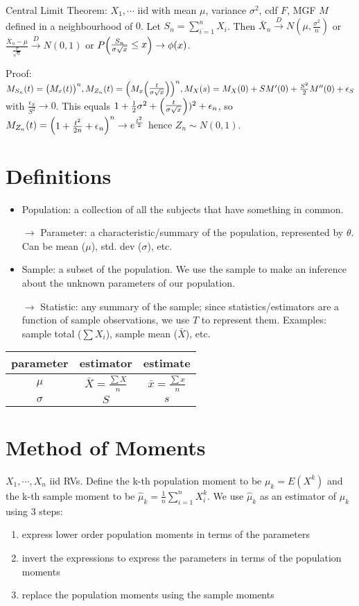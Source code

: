 \documentclass[letterpaper, 8pt]{extarticle}
\begin{document}
\begin{multicols*}{3}
	Central Limit Theorem: $X_1,\cdots$ iid with mean $\mu$, variance $\sigma^2$, cdf $F$, MGF $M$ defined in a neighbourhood of $0$. Let $S_n=\sum_{i=1}^n X_i$. Then $\bar X_n\overset{D}{\to}N(\mu,\frac{\sigma^2}{n})$ or $\frac{\bar X_n-\mu}{\frac{\sigma}{\sqrt n}}\overset{D}{\to}N(0,1)$ or $P\mqty(\frac{S_n}{\sigma\sqrt x}\leq x)\rightarrow\phi(x)$.
	
	Proof: $M_{S_n}(t)=\mqty(M_x(t))^n,M_{Z_n}(t)=\mqty(M_x\mqty(\frac{t}{\sigma\sqrt x}))^n,M_X(s)=M_X(0)+SM'(0)+\frac{S^2}{2}M''(0)+\epsilon_S$ with $\frac{\epsilon_S}{S^2}\to 0$. This equals $1+\frac{1}{2}\sigma^2+\mqty(\frac{t}{\sigma\sqrt x}))^2+\epsilon_n$, so $M_{Z_n}(t)=\mqty(1+\frac{t^2}{2n}+\epsilon_n)^n\to e^{\frac{t^2}{2}}$ hence $Z_n\sim N(0,1)$.
	
	\section{Definitions}
	\begin{itemize}
		\item Population: a collection of all the subjects that have something in common.
		\item[$\to$] Parameter: a characteristic/summary of the population, represented by $\theta$. Can be mean ($\mu$), std. dev ($\sigma$), etc.
		\item Sample: a subset of the population. We use the sample to make an inference about the unknown parameters of our population.
		\item[$\to$] Statistic: any summary of the sample; since statistics/estimators are a function of sample observations, we use $T$ to represent them. Examples: sample total ($\sum X_i$), sample mean ($\bar X$), etc.
	\end{itemize}
	\begin{center}	
	\begin{tabular}{|c|c|c|}
		\hline
		parameter & estimator & estimate \\\hline
		$\mu$ & $\bar X=\frac{\sum X}{n}$ & $\bar x=\frac{\sum x}{n}$ \\
		$\sigma$ & $S$ & $s$\\\hline
	\end{tabular}
	\end{center}
	
	\section{Method of Moments}
	$X_1,\cdots,X_n$ iid RVs. Define the k-th population moment to be $\mu_k=E(X^k)$ and the k-th sample moment to be $\hat\mu_k=\frac{1}{n}\sum_{i=1}^nX_i^k$. We use $\hat\mu_k$ as an estimator of $\mu_k$ using 3 steps:
	\begin{enumerate}
		\item express lower order population moments in terms of the parameters
		\item invert the expressions to express the parameters in terms of the population moments
		\item replace the population moments using the sample moments
	\end{enumerate}

\end{multicols*}
\end{document}
